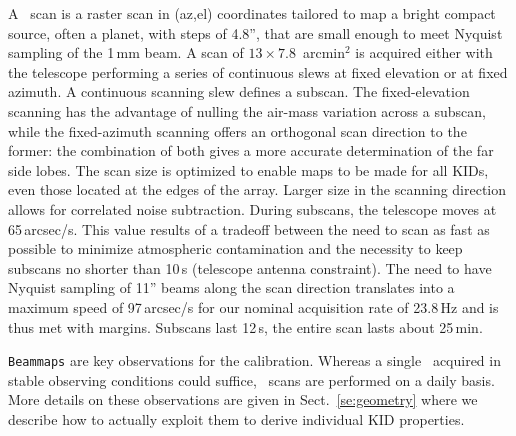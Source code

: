 A \bm\ scan is a raster scan in (az,el) coordinates tailored to map a
bright compact source, often a planet, with steps of 4.8'', that are
small enough to meet Nyquist sampling of the 1\,mm beam. A scan of 
$13\times7.8$~arcmin$^2$ is acquired either with the telescope
performing a series of continuous slews at fixed elevation or at fixed azimuth. 
A continuous scanning slew defines a subscan. 
The fixed-elevation scanning has the advantage of nulling the air-mass variation
across a subscan, while the fixed-azimuth scanning offers an
orthogonal scan direction to the former:
the combination of both gives a more accurate determination of the far side
lobes.
The scan size is optimized to enable maps to be made for all
KIDs, even those located at the edges of the array. Larger size in the scanning
direction allows for correlated noise subtraction.
During subscans, the telescope moves at
65\,arcsec/s. This value results of a tradeoff between the need to scan as
fast as possible to minimize atmospheric contamination and the
necessity to keep subscans no shorter than 10\,s (telescope antenna 
constraint). The need to have Nyquist sampling of 11'' beams along the
scan direction translates into a maximum speed of 97\,arcsec/s
for our nominal acquisition rate of 23.8\,Hz and is thus met with margins. Subscans
last 12\,s, the entire scan lasts about 25\,min.%

{\tt Beammaps} are key observations for the calibration. {\lp Whereas
a single \bm\ acquired in stable observing conditions could suffice,
\bm\ scans are performed on a daily basis.}
More details on these observations are given in Sect.~\ref{se:geometry}
where we describe how to actually exploit them to derive individual KID
properties.

